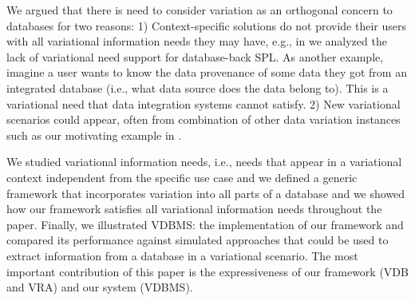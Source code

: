 


We argued that there is need to consider variation as an 
orthogonal concern to databases for two reasons:
1) Context-specific solutions do not provide their users with all 
variational information needs they may have, e.g., in 
we analyzed the lack of variational need support for database-back SPL.
As another example, imagine a user wants to know the data provenance of some
data they got from an integrated database 
 (i.e., what data source does the data belong to). This is a variational need that 
data integration systems cannot satisfy.
2) New variational scenarios could appear, often from combination of other data variation instances 
such as our motivating example in .


We studied variational information needs, i.e., needs that appear in a 
variational context independent from the specific use case and 
we defined a generic framework that incorporates variation into all
parts of a database and we showed how our framework satisfies 
all variational information needs throughout the paper.
Finally, we illustrated VDBMS: the implementation of our framework
and compared its performance against simulated approaches that
could be used to extract information from a database in a variational
scenario.
The most important contribution of this paper is the expressiveness of
our framework (VDB and VRA) and our system (VDBMS).

